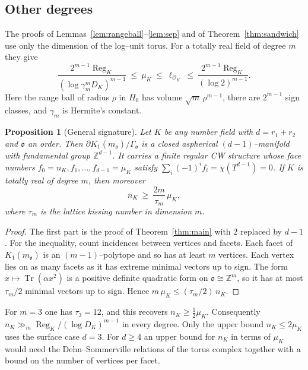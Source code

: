 \documentclass[11pt,reqno]{amsart}
\theoremstyle{plain}
\newtheorem{proposition}[theorem]{Proposition}
\theoremstyle{definition}
\newcommand{\Z}{\mathbb{Z}}
\newcommand{\Tr}{\operatorname{Tr}}
\newcommand{\Reg}{\operatorname{Reg}}
\newcommand{\Ok}{\mathfrak{o}}
\newcommand{\bdy}{\partial}
\newcommand{\nK}{n_K}
\newcommand{\muK}{\mu_K}
\begin{document}
\subsection{Other degrees}
The proofs of Lemmas~\ref{lem:rangeball}--\ref{lem:sep} and of Theorem~\ref{thm:sandwich} use only the
dimension of the log--unit torus. For a totally real field of degree $m$ they give
\begin{equation}\label{eq:general}
\frac{2^{m-1}\Reg_K}{(\log\gamma_m^mD_K)^{m-1}}\ \le\ \muK\ \le\ \ell_{\mathcal O_K}\ \le\
\frac{2^{m-1}\Reg_K}{(\log2)^{m-1}} .
\end{equation}
Here the range ball of radius $\rho$ in $H_0$ has volume $\sqrt m\,\rho^{m-1}$, there are $2^{m-1}$ sign
classes, and $\gamma_m$ is Hermite's constant.

\begin{proposition}[General signature]\label{prop:general}
Let $K$ be any number field with $d=r_1+r_2$ and $\Ok$ an order. Then $\bdy K_1(m_\Ok)/\Gamma_\Ok$ is a closed
aspherical $(d-1)$--manifold with fundamental group $\Z^{d-1}$. It carries a finite regular CW structure whose
face numbers $f_0=\nK,f_1,\dots,f_{d-1}=\muK$ satisfy $\sum_i(-1)^if_i=\chi(T^{d-1})=0$. If $K$ is totally real
of degree $m$, then moreover
\[
\nK\ \ge\ \frac{2m}{\tau_m}\,\muK ,
\]
where $\tau_m$ is the lattice kissing number in dimension $m$.
\end{proposition}

\begin{proof}
The first part is the proof of Theorem~\ref{thm:main} with $2$ replaced by $d-1$. For the inequality, count
incidences between vertices and facets. Each facet of $K_1(m_\Ok)$ is an $(m-1)$--polytope and so has at least
$m$ vertices. Each vertex lies on as many facets as it has extreme minimal vectors up to sign. The form
$x\mapsto\Tr(\alpha x^2)$ is a positive definite quadratic form on $\Ok\cong\Z^m$, so it has at most
$\tau_m/2$ minimal vectors up to sign. Hence $m\,\muK\le(\tau_m/2)\,\nK$.
\end{proof}

For $m=3$ one has $\tau_3=12$, and this recovers $\nK\ge\tfrac12\muK$. Consequently $\nK\gg_m\Reg_K/(\log
D_K)^{m-1}$ in every degree. Only the upper bound $\nK\le2\muK$ uses the surface case $d=3$. For $d\ge4$ an
upper bound for $\nK$ in terms of $\muK$ would need the Dehn--Sommerville relations of the torus complex
together with a bound on the number of vertices per facet.
\end{document}

